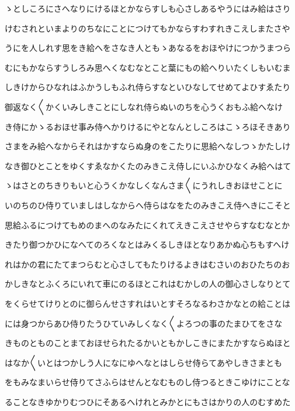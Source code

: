 \documentclass[a4paper,11pt,landscape]{ltjtarticle}
\begin{document}
\par\medskip
ゝとしころにさへなりにけるほとかならすしも心さしあるやうにはみ給はさり
\par\medskip
けむされといまよりのちなにことにつけてもかならすわすれきこえしまたさや
\par\medskip
うにを人しれす思をき給へをさなき人ともゝあなるをおほやけにつかうまつら
\par\medskip
むにもかならすうしろみ思へくなむなとこと葉にもの給へりいたくしもいむま
\par\medskip
しきけからひなれはふかうしもふれ侍らすなといひなしてせめてよひすゑたり
\par\medskip
御返なく〱かくいみしきことにしなれ侍らぬいのちを心うくおもふ給へなけ
\par\medskip
き侍にかゝるおほせ事み侍へかりけるにやとなんとしころはこゝろほそきあり
\par\medskip
さまをみ給へなからそれはかすならぬ身のをこたりに思給へなしつゝかたしけ
\par\medskip
なき御ひとことをゆくすゑなかくたのみきこえ侍しにいふかひなくみ給へはて
\par\medskip
ゝはさとのちきりもいと心うくかなしくなんさま〱にうれしきおほせことに
\par\medskip
いのちのひ侍りていましはしなからへ侍らはなをたのみきこえ侍へきにこそと
\par\medskip
思給ふるにつけてもめのまへのなみたにくれてえきこえさせやらすなむなとか
\par\medskip
きたり御つかひになへてのろくなとはみくるしきほとなりあかぬ心ちもすへけ
\par\medskip
れはかの君にたてまつらむと心さしてもたりけるよきはむさいのおひたちのお
\par\medskip
かしきなとふくろにいれて車にのるほとこれはむかしの人の御心さしなりとて
\par\medskip
をくらせてけりとのに御らんせさすれはいとすそろなるわさかなとの給ことは
\par\medskip
には身つからあひ侍りたうひていみしくなく〱よろつの事のたまひてをさな
\par\medskip
きものとものことまておほせられたるかいともかしこきにまたかすならぬほと
\par\medskip
はなか〱いとはつかしう人になにゆへなとはしらせ侍らてあやしきさまとも
\par\medskip
をもみなまいらせ侍りてさふらはせんとなむものし侍つるときこゆけにことな
\par\medskip
ることなきゆかりむつひにそあるへけれとみかとにもさはかりの人のむすめた
\par\medskip
\end{document}
